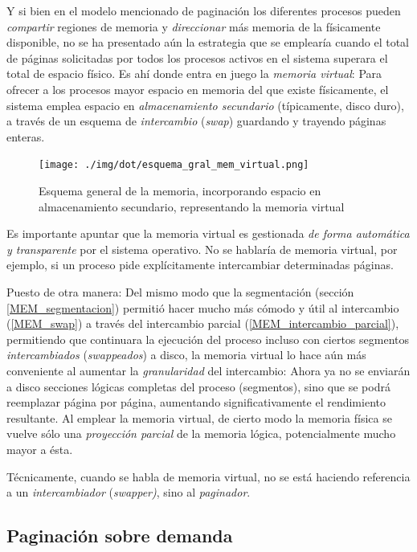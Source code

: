 \documentclass[11pt,fleqn]{book} %
\begin{document}
Y si bien en el modelo mencionado de paginación los
diferentes procesos pueden \emph{compartir} regiones de memoria y
\emph{direccionar} más memoria de la físicamente disponible, no se ha presentado
aún la estrategia que se emplearía cuando el total de páginas solicitadas por
todos los procesos activos en el sistema superara el total de espacio
físico. Es ahí donde entra en juego la \emph{memoria virtual}: Para ofrecer
a los procesos mayor espacio en memoria del que existe físicamente, el
sistema emplea espacio en \emph{almacenamiento secundario} (típicamente,
disco duro), a través de un esquema de \emph{intercambio} (\emph{swap}) guardando
y trayendo páginas enteras.

\begin{figure}[htb]
\centering
\texttt{[image: ./img/dot/esquema\_gral\_mem\_virtual.png]}
\caption{\label{MEM_esquema_gral_mem_virtual}Esquema general de la memoria, incorporando espacio en almacenamiento secundario, representando la memoria virtual}
\end{figure}

Es importante apuntar que la memoria virtual es gestionada \emph{de forma automática y transparente} por el sistema operativo. No se hablaría
de memoria virtual, por ejemplo, si un proceso pide explícitamente
intercambiar determinadas páginas.

Puesto de otra manera: Del mismo modo que la segmentación (sección
\ref{MEM_segmentacion}) permitió hacer mucho más cómodo y útil al
intercambio (\ref{MEM_swap}) a través del intercambio parcial
(\ref{MEM_intercambio_parcial}), permitiendo que continuara la
ejecución del proceso incluso con ciertos segmentos \emph{intercambiados}
(\emph{swappeados}) a disco, la memoria virtual lo hace aún más conveniente
al aumentar la \emph{granularidad} del intercambio: Ahora ya no se
enviarán a disco secciones lógicas completas del proceso (segmentos),
sino que se podrá reemplazar página por página, aumentando significativamente
el rendimiento resultante. Al emplear la memoria virtual, de
cierto modo la memoria física se vuelve sólo una \emph{proyección parcial}
de la memoria lógica, potencialmente mucho mayor a ésta.

Técnicamente, cuando se habla de memoria virtual, no se está
haciendo referencia a un \emph{intercambiador} (\emph{swapper)}, sino al \emph{paginador}.
\subsection{Paginación sobre demanda}
\label{sec-5-5-1}
\label{MEM_pag_sobre_demanda}
\end{document}

